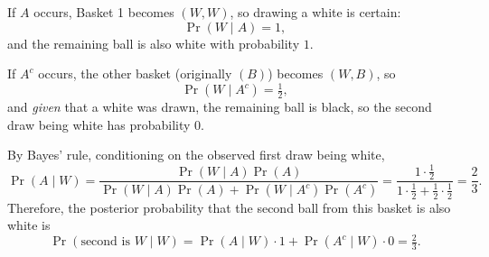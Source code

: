 \documentclass{article}
\begin{document}
If $A$ occurs, Basket 1 becomes $(W,W)$, so drawing a white is certain:
\[
\Pr(W\mid A)=1,
\]
and the remaining ball is also white with probability $1$.

If $A^c$ occurs, the other basket (originally $(B)$) becomes $(W,B)$, so
\[
\Pr(W\mid A^c)=\tfrac12,
\]
and \emph{given} that a white was drawn, the remaining ball is black, so the second draw being white has probability $0$.

By Bayes' rule, conditioning on the observed first draw being white,
\[
\Pr(A\mid W)=\frac{\Pr(W\mid A)\Pr(A)}{\Pr(W\mid A)\Pr(A)+\Pr(W\mid A^c)\Pr(A^c)}
=\frac{1\cdot \tfrac12}{1\cdot \tfrac12+\tfrac12\cdot \tfrac12}
=\frac{2}{3}.
\]
Therefore, the posterior probability that the second ball from this basket is also white is
\[
\Pr(\text{second is } W \mid W)=\Pr(A\mid W)\cdot 1+\Pr(A^c\mid W)\cdot 0=\boxed{\tfrac{2}{3}}.
\]
\end{document}
